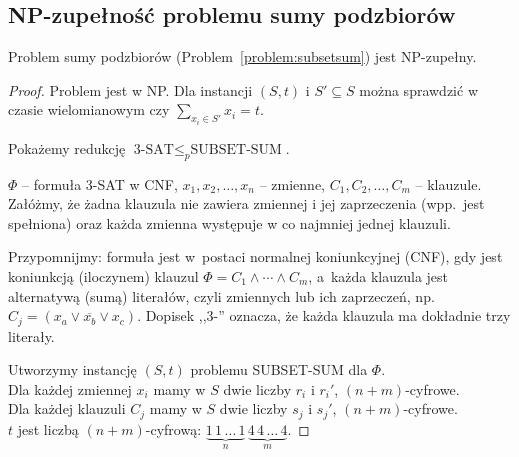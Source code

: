 \subsection{NP-zupełność problemu sumy podzbiorów}

\begin{theorem}
	Problem sumy podzbiorów (Problem~\ref{problem:subsetsum}) jest NP-zupełny.
\end{theorem}
\begin{proof}
	Problem jest w NP. Dla instancji $(S, t)$ i $S' \subseteq S$ można sprawdzić w czasie wielomianowym czy $\sum_{x_i \in S'} x_i = t$.

	Pokażemy redukcję $\text{3-SAT} \leq_p \text{SUBSET-SUM}$.

	$\Phi$ -- formuła 3-SAT w CNF, $x_1, x_2, \ldots, x_n$ -- zmienne, $C_1, C_2, \ldots, C_m$ -- klauzule. Załóżmy, że żadna klauzula nie zawiera zmiennej i jej zaprzeczenia (wpp.\ jest spełniona) oraz każda zmienna występuje w co najmniej jednej klauzuli.

	\begin{dygresja}
		Przypomnijmy: formuła jest w~postaci normalnej koniunkcyjnej (CNF), gdy jest koniunkcją (iloczynem) klauzul $\Phi = C_1 \wedge \cdots \wedge C_m$, a~każda klauzula jest alternatywą (sumą) literałów, czyli zmiennych lub ich zaprzeczeń, np.\ $C_j = (x_a \vee \overline{x_b} \vee x_c)$. Dopisek ,,3-'' oznacza, że każda klauzula ma dokładnie trzy literały.
	\end{dygresja}

	Utworzymy instancję $(S, t)$ problemu SUBSET-SUM dla $\Phi$.\\
	Dla każdej zmiennej $x_i$ mamy w $S$ dwie liczby $r_i$ i $r_i'$, $(n+m)$-cyfrowe.\\
	Dla każdej klauzuli $C_j$ mamy w $S$ dwie liczby $s_j$ i $s_j'$, $(n+m)$-cyfrowe.\\
	$t$ jest liczbą $(n+m)$-cyfrową: $\underbrace{1\,1\,\ldots\,1}_{n}\,\underbrace{4\,4\,\ldots\,4}_{m}$.


\end{proof}
